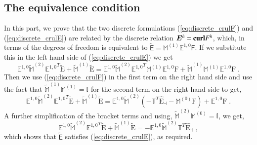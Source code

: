 \documentclass[graybox]{svmult}
\begin{document}
\subsection{The equivalence condition}\label{sec:equivalence}
In this part, we prove that the two discrete formulations (\ref{eq:discrete_crulF}) and (\ref{eq:discrete_crulE}) are related by the discrete relation $\bm{E}^h = \mbox{\bf{curl}}F^h$, which, in terms of the degrees of freedom is equivalent to $\widetilde{\mathsf{E}}=\mathbb{M}^{(1)}\mathbb{E}^{1,0}\mathsf{F}$.
If we substitute this in the left hand side of (\ref{eq:discrete_crulE}) we get
\begin{equation}
{\mathbb{E}^{1,0}} \widetilde{\mathbb{M}}^{(2)} {\mathbb{E}^{1,0}}^T \widetilde{\mathrm{E}} + \widetilde{\mathbb{M}}^{(1)} \widetilde{\mathrm{E}} = {\mathbb{E}^{1,0}} \widetilde{\mathbb{M}}^{(2)} {\mathbb{E}^{1,0}}^T \mathbb{M}^{(1)} \mathbb{E}^{1,0} \mathrm{F} + \widetilde{\mathbb{M}}^{(1)} \mathbb{M}^{(1)} \mathbb{E}^{1,0} \mathrm{F} \;.
\end{equation}
Then we use (\ref{eq:discrete_crulF}) in the first term on the right hand side and use the fact that $\widetilde{\mathbb{M}}^{(1)}\mathbb{M}^{(1)} = \mathbb{I}$ for the second term on the right hand side to get,
\begin{equation}
{\mathbb{E}^{1,0}} \widetilde{\mathbb{M}}^{(2)} {\mathbb{E}^{1,0}}^T \widetilde{\mathrm{E}} + \widetilde{\mathbb{M}}^{(1)} \widetilde{\mathrm{E}} = {\mathbb{E}^{1,0}} \widetilde{\mathbb{M}}^{(2)} (-\mathbb{T}^T \hat{\mathrm{E}}_\dashv - \mathbb{M}^{(0)} \mathrm{F}) + \mathbb{E}^{1,0} \mathrm{F} \;.
\end{equation}
A further simplification of the bracket terms and using, $\widetilde{\mathbb{M}}^{(2)}\mathbb{M}^{(0)} = \mathbb{I}$, we get,
\begin{equation}
{\mathbb{E}^{1,0}} \widetilde{\mathbb{M}}^{(2)} {\mathbb{E}^{1,0}}^T \widetilde{\mathrm{E}} + \widetilde{\mathbb{M}}^{(1)} \widetilde{\mathrm{E}} = -\mathbb{E}^{1,0} \widetilde{\mathbb{M}}^{(2)} \mathbb{T}^T \hat{\mathrm{E}}_\dashv \;,
\end{equation}
which shows that $\widetilde{\mathsf{E}}$ satisfies (\ref{eq:discrete_crulE}), as required.
\end{document}
